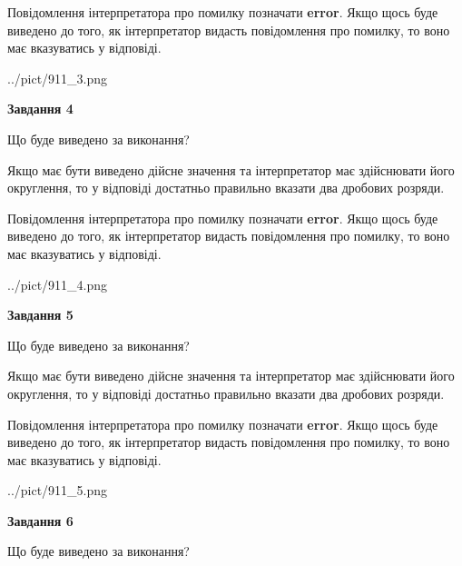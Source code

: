\documentclass[12pt, ukrainian]{article}
\begin{document}
{\begin {Large}
Повідомлення інтерпретатора про помилку позначати \textbf{error}.
Якщо щось буде виведено до того, як інтерпретатор видасть повідомлення про помилку, 
то воно має вказуватись у відповіді. \par

\begin{center}
	{../pict/911_3.png}
\end{center}
\newpage

{\begin {center}\textbf{Завдання 4}\end {center}}\par
Що буде виведено за виконання? \par

Якщо має бути виведено дійсне значення та інтерпретатор має здійснювати його округлення, 
то у відповіді достатньо правильно вказати два дробових розряди.

Повідомлення інтерпретатора про помилку позначати \textbf{error}.
Якщо щось буде виведено до того, як інтерпретатор видасть повідомлення про помилку, 
то воно має вказуватись у відповіді. \par

\begin{center}
	{../pict/911_4.png}
\end{center}
\newpage

{\begin {center}\textbf{Завдання 5}\end {center}}\par
Що буде виведено за виконання? \par

Якщо має бути виведено дійсне значення та інтерпретатор має здійснювати його округлення, 
то у відповіді достатньо правильно вказати два дробових розряди.

Повідомлення інтерпретатора про помилку позначати \textbf{error}.
Якщо щось буде виведено до того, як інтерпретатор видасть повідомлення про помилку, 
то воно має вказуватись у відповіді. \par

\begin{center}
	{../pict/911_5.png}
\end{center}
\newpage

{\begin {center}\textbf{Завдання 6}\end {center}}\par
Що буде виведено за виконання? \par


\end{Large}}
\end{document}

